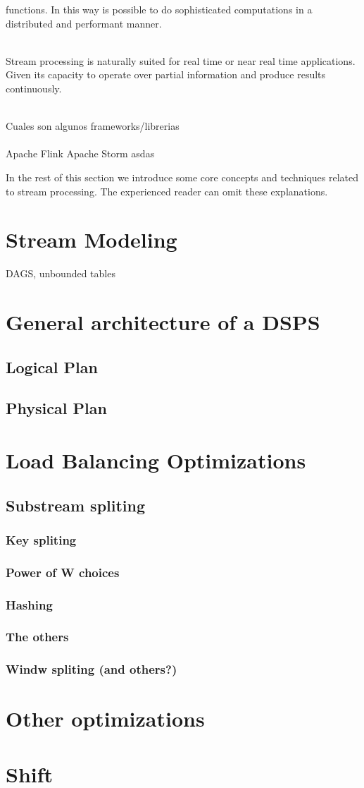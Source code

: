   functions. In this way is possible to do sophisticated computations in a distributed and performant manner.\\\\



  Stream processing is naturally suited for real time or near real time applications. Given its capacity to operate over partial information and produce results continuously.\\\\


    Cuales son algunos frameworks/librerias\\\\
    Apache Flink
    Apache Storm asdas

In the rest of this section we introduce some core concepts and techniques related to stream processing. The experienced reader can omit these explanations.

  \section{Stream Modeling}
DAGS, unbounded tables
\section{General architecture of a DSPS}
\subsection{Logical Plan}
\subsection{Physical Plan}
\section{Load Balancing Optimizations}
\subsection{Substream spliting}
\subsubsection{Key spliting}
\subsubsection{Power of W choices}
\subsubsection{Hashing}
\subsubsection{The others}
\subsubsection{Windw spliting (and others?)}
\section{Other optimizations}
\section{Shift}
